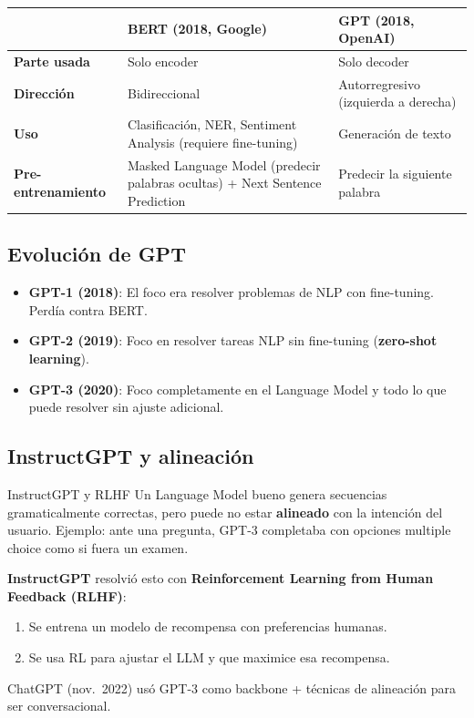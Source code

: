 \documentclass[12pt, a4paper]{article}
\begin{document}
\begin{center}
	\begin{tabular}{lp{5.5cm}p{5.5cm}}
		\toprule
		                           & \textbf{BERT (2018, Google)}                                                 & \textbf{GPT (2018, OpenAI)}          \\
		\midrule
		\textbf{Parte usada}       & Solo encoder                                                                 & Solo decoder                         \\
		\textbf{Dirección}         & Bidireccional                                                                & Autorregresivo (izquierda a derecha) \\
		\textbf{Uso}               & Clasificación, NER, Sentiment Analysis (requiere fine-tuning)                & Generación de texto                  \\
		\textbf{Pre-entrenamiento} & Masked Language Model (predecir palabras ocultas) + Next Sentence Prediction & Predecir la siguiente palabra        \\
		\bottomrule
	\end{tabular}
\end{center}

\subsection{Evolución de GPT}

\begin{itemize}
	\item \textbf{GPT-1 (2018)}: El foco era resolver problemas de NLP con fine-tuning. Perdía contra BERT.
	\item \textbf{GPT-2 (2019)}: Foco en resolver tareas NLP sin fine-tuning (\textbf{zero-shot learning}).
	\item \textbf{GPT-3 (2020)}: Foco completamente en el Language Model y todo lo que puede resolver sin ajuste adicional.
\end{itemize}

\subsection{InstructGPT y alineación}

\begin{defbox}{InstructGPT y RLHF}
	Un Language Model bueno genera secuencias gramaticalmente correctas, pero puede no estar \textbf{alineado} con la intención del usuario. Ejemplo: ante una pregunta, GPT-3 completaba con opciones multiple choice como si fuera un examen.

	\textbf{InstructGPT} resolvió esto con \textbf{Reinforcement Learning from Human Feedback (RLHF)}:
	\begin{enumerate}
		\item Se entrena un modelo de recompensa con preferencias humanas.
		\item Se usa RL para ajustar el LLM y que maximice esa recompensa.
	\end{enumerate}

	ChatGPT (nov.\ 2022) usó GPT-3 como backbone + técnicas de alineación para ser conversacional.
\end{defbox}
\end{document}
